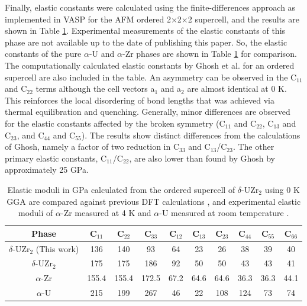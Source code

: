 \documentclass[preprint,12pt]{elsarticle}
\begin{document}
Finally, elastic constants were calculated using the finite-differences approach as implemented in VASP for the AFM ordered 2$\times$2$\times$2 supercell, and the results are shown in Table \ref{tab:elas_const}. Experimental measurements of the elastic constants of this phase are not available up to the date of publishing this paper. So, the elastic constants of the pure $\alpha$-U and $\alpha$-Zr phases are shown in Table \ref{tab:elas_const} for comparison. The computationally calculated elastic constants by Ghosh et al. \cite{ghosh_chemical_2021} for an ordered supercell are also included in the table. An asymmetry can be observed in the C$_{11}$ and C$_{22}$ terms although the cell vectors a$_{1}$ and a$_{2}$ are almost identical at 0 K. This reinforces the local disordering of bond lengths that was achieved via thermal equilibration and quenching. Generally, minor differences are observed for the elastic constants affected by the broken symmetry (C$_{11}$ and C$_{22}$, C$_{13}$ and C$_{23}$, and C$_{44}$ and C$_{55}$). The results show distinct differences from the calculations of Ghosh, namely a factor of two reduction in C$_{33}$ and C$_{13}$/C$_{23}$. The other primary elastic constants, C$_{11}$/C$_{22}$, are also lower than found by Ghosh \cite{ghosh_chemical_2021} by approximately 25 GPa. 

\begin{table}[h!]
    \centering
        \caption{Elastic moduli in GPa calculated from the ordered supercell of $\delta$-UZr$_2$ using 0 K GGA are compared against previous DFT calculations \cite{ghosh_chemical_2021}, and experimental elastic moduli of $\alpha$-Zr measured at 4 K \cite{fisher_single-crystal_1964} and $\alpha$-U measured at room temperature \cite{fisher_adiabatic_1958}.}
    \label{tab:elas_const}
    \begin{tabular}{|c|c|c|c|c|c|c|c|c|c|}
    \hline
Phase & C$_{11}$ & C$_{22}$ & C$_{33}$  & C$_{12}$ & C$_{13}$ & C$_{23}$ & C$_{44}$ & C$_{55}$ & C$_{66}$   \\
 \hline
   $\delta$-UZr$_2$ (This work) &136& 140 & 93 & 64 & 23 &26 & 38 & 39 & 40 \\
   \hline
     $\delta$-UZr$_2$ \cite{ghosh_chemical_2021} &175& 175 & 186 & 92 & 50 &50 & 43 & 43 & 41 \\
   \hline
   $\alpha$-Zr  \cite{fisher_single-crystal_1964} & 155.4 &155.4 &172.5 &67.2 &64.6 &64.6 &36.3 &36.3 &44.1 \\
   \hline
    $\alpha$-U \cite{fisher_adiabatic_1958} & 215&199 &267 &46 &22 &108 & 124& 73&74\\
     \hline
    \end{tabular}
\end{table}
\end{document}
